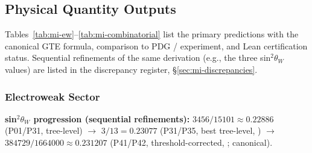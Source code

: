 \subsection{Physical Quantity Outputs}
\label{sec:mi-outputs}

Tables~\ref{tab:mi-ew}--\ref{tab:mi-combinatorial} list the primary predictions
with the canonical GTE formula, comparison to PDG / experiment, and Lean certification
status. Sequential refinements of the same derivation (e.g., the three sin$^2\theta_W$
values) are listed in the discrepancy register, \S\ref{sec:mi-discrepancies}.

\subsubsection{Electroweak Sector}
\label{sec:mi-ew}

\textbf{sin$^2\theta_W$ progression (sequential refinements):}
$3456/15101 \approx 0.22886$ (P01/P31, tree-level) $\to$
$3/13 = 0.23077$ (P31/P35, best tree-level, \CatAL) $\to$
$384729/1664000 \approx 0.231207$ (P41/P42, threshold-corrected, \CatAL; canonical).

